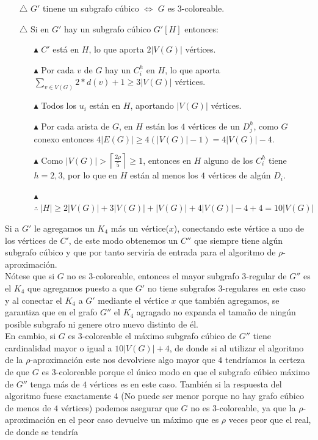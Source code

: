 \documentclass{article}
\begin{document}
\begin{itemize}
    \item[$\triangle $] $G'$ tinene un subgrafo c\'ubico $\Leftrightarrow $ $G$ es $3$-coloreable.
    \item[$\triangle $] Si en $G'$ hay un subgrafo c\'ubico $G'[H]$ entonces: 
    \begin{itemize}
        \item[$\blacktriangle $] $C'$ est\'a en $H$, lo que aporta $2|V(G)|$ v\'ertices.
        \item[$\blacktriangle $] Por cada $v$ de $G$ hay un $C_i^h$ en $H$, lo que aporta $\sum_{v \in V(G)} 2*d(v) + 1 \geq 3|V(G)|$ v\'ertices.
        \item[$\blacktriangle $] Todos los $u_i$ est\'an en $H$, aportando $|V(G)|$ v\'ertices.
        \item[$\blacktriangle $] Por cada arista de $G$, en $H$ est\'an los $4$ v\'ertices de un $D_j^h$, como $G$ conexo entonces $4|E(G)| \geq 4(|V(G)| - 1) = 4|V(G)|-4$.
        \item[$\blacktriangle $] Como $|V(G)| > \left\lceil \frac{2 \rho}{5} \right\rceil \geq 1 $, entonces en $H$ alguno de los $C_i^h$ tiene $h =2,3$, por lo que en $H$ est\'an al menos los $4$ v\'ertices de alg\'un $D_i$.
        \item[$\blacktriangle $] $\therefore~ |H| \geq 2|V(G)| + 3|V(G)| + |V(G)| + 4|V(G)|-4 +4 = 10|V(G)|$
    \end{itemize}
\end{itemize}
Si a $G'$ le agregamos un $K_4$ m\'as un v\'ertice($x$), conectando este v\'ertice a uno de los v\'ertices de $C'$, de este modo obtenemos un $C''$ que siempre tiene alg\'un subgrafo c\'ubico y que por tanto 
servir\'ia de entrada para el algoritmo de $\rho$-aproximaci\'on. \\

N\'otese que si $G$ no es $3$-coloreable, entonces el mayor subgrafo $3$-regular de $G''$ es el $K_4$ que agregamos puesto a que $G'$ no tiene 
subgrafos $3$-regulares en este caso y al conectar el $K_4$ a $G'$ mediante el v\'ertice $x$ que tambi\'en agregamos, se garantiza que en el grafo $G''$ el $K_4$
agragado no expanda el tama\~no de ning\'un posible subgrafo ni genere otro nuevo distinto de \'el.\\ 

En cambio, si $G$ es $3$-coloreable el m\'aximo subgrafo c\'ubico de $G''$ tiene cardinalidad mayor o igual a $10|V(G)| + 4$, de donde si al utilizar el algoritmo de la $\rho$-aproximaci\'on 
este nos devolviese algo mayor que $4$ tendr\'iamos la certeza de que $G$ es $3$-coloreable porque el \'unico modo en que el subgrafo c\'ubico m\'aximo de $G''$ tenga m\'as de $4$ v\'ertices es en este caso. Tambi\'en si 
la respuesta del algoritmo fuese exactamente $4$ (No puede ser menor porque no hay grafo c\'ubico de menos de $4$ v\'ertices) podemos asegurar que $G$ no es $3$-coloreable, ya que la $\rho$-aproximaci\'on en el peor caso devuelve un m\'aximo que es $\rho$ veces 
peor que el real, de donde se tendr\'ia 
\end{document}
